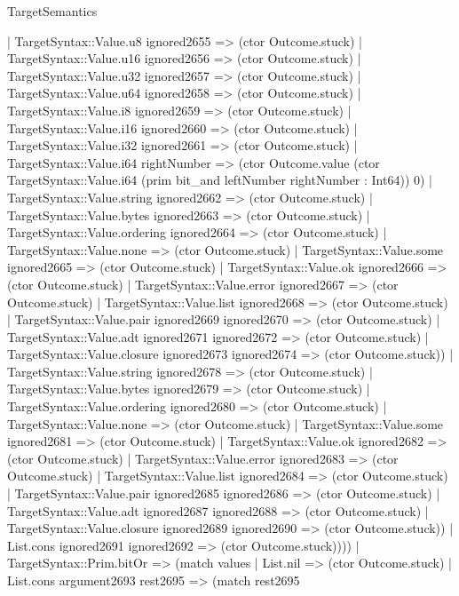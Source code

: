 \begin{lexlean}{TargetSemantics}
\begin{semanticmodule}
{              | TargetSyntax::Value.u8 ignored2655 => (ctor Outcome.stuck)
              | TargetSyntax::Value.u16 ignored2656 => (ctor Outcome.stuck)
              | TargetSyntax::Value.u32 ignored2657 => (ctor Outcome.stuck)
              | TargetSyntax::Value.u64 ignored2658 => (ctor Outcome.stuck)
              | TargetSyntax::Value.i8 ignored2659 => (ctor Outcome.stuck)
              | TargetSyntax::Value.i16 ignored2660 => (ctor Outcome.stuck)
              | TargetSyntax::Value.i32 ignored2661 => (ctor Outcome.stuck)
              | TargetSyntax::Value.i64 rightNumber => (ctor Outcome.value (ctor TargetSyntax::Value.i64 (prim bit_and leftNumber rightNumber : Int64)) 0)
              | TargetSyntax::Value.string ignored2662 => (ctor Outcome.stuck)
              | TargetSyntax::Value.bytes ignored2663 => (ctor Outcome.stuck)
              | TargetSyntax::Value.ordering ignored2664 => (ctor Outcome.stuck)
              | TargetSyntax::Value.none => (ctor Outcome.stuck)
              | TargetSyntax::Value.some ignored2665 => (ctor Outcome.stuck)
              | TargetSyntax::Value.ok ignored2666 => (ctor Outcome.stuck)
              | TargetSyntax::Value.error ignored2667 => (ctor Outcome.stuck)
              | TargetSyntax::Value.list ignored2668 => (ctor Outcome.stuck)
              | TargetSyntax::Value.pair ignored2669 ignored2670 => (ctor Outcome.stuck)
              | TargetSyntax::Value.adt ignored2671 ignored2672 => (ctor Outcome.stuck)
              | TargetSyntax::Value.closure ignored2673 ignored2674 => (ctor Outcome.stuck))
            | TargetSyntax::Value.string ignored2678 => (ctor Outcome.stuck)
            | TargetSyntax::Value.bytes ignored2679 => (ctor Outcome.stuck)
            | TargetSyntax::Value.ordering ignored2680 => (ctor Outcome.stuck)
            | TargetSyntax::Value.none => (ctor Outcome.stuck)
            | TargetSyntax::Value.some ignored2681 => (ctor Outcome.stuck)
            | TargetSyntax::Value.ok ignored2682 => (ctor Outcome.stuck)
            | TargetSyntax::Value.error ignored2683 => (ctor Outcome.stuck)
            | TargetSyntax::Value.list ignored2684 => (ctor Outcome.stuck)
            | TargetSyntax::Value.pair ignored2685 ignored2686 => (ctor Outcome.stuck)
            | TargetSyntax::Value.adt ignored2687 ignored2688 => (ctor Outcome.stuck)
            | TargetSyntax::Value.closure ignored2689 ignored2690 => (ctor Outcome.stuck))
          | List.cons ignored2691 ignored2692 => (ctor Outcome.stuck))))
    | TargetSyntax::Prim.bitOr => (match values
      | List.nil => (ctor Outcome.stuck)
      | List.cons argument2693 rest2695 => (match rest2695
}
\end{semanticmodule}
\end{lexlean}
